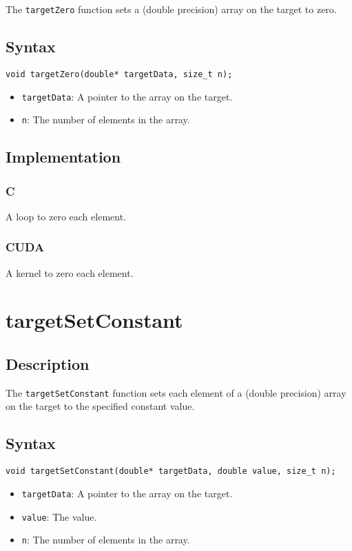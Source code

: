 The \verb+targetZero+ function sets a (double precision) array on the target to zero.

\subsection{Syntax}
\begin{verbatim}
void targetZero(double* targetData, size_t n);
\end{verbatim}

\begin{itemize}
\item \verb+targetData+: A pointer to the array on the target.
\item \verb+n+: The number of elements in the array.
\end{itemize}

\subsection{Implementation}
\subsubsection{C}
A loop to zero each element.
\subsubsection{CUDA}
A kernel to zero each element.


\newpage
\section{targetSetConstant}

\subsection{Description}

The \verb+targetSetConstant+ function sets each element of a (double precision) array on the target to the specified constant value.

\subsection{Syntax}
\begin{verbatim}
void targetSetConstant(double* targetData, double value, size_t n);
\end{verbatim}

\begin{itemize}
\item \verb+targetData+: A pointer to the array on the target.
\item \verb+value+: The value.
\item \verb+n+: The number of elements in the array.
\end{itemize}

